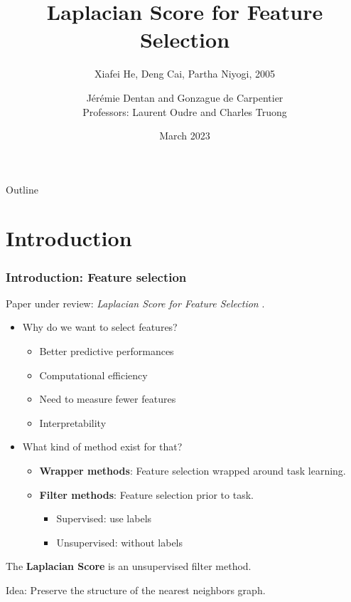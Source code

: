 \documentclass{beamer}
\title[Laplacian Score]{Laplacian Score for Feature Selection}
\subtitle{
    Xiafei He, Deng Cai, Partha Niyogi, 2005
}
\author{Jérémie Dentan and Gonzague de Carpentier \\ Professors: Laurent Oudre and Charles Truong}
\date{March 2023}
\begin{document}
\frame{\titlepage}

\begin{frame}{Outline}
    \tableofcontents
\end{frame}


\section{Introduction}
\begin{frame}
\frametitle{Introduction: Feature selection}

Paper under review: \textit{Laplacian Score for Feature Selection} \cite{he_laplacian_2005}.

\medskip

\begin{itemize}
    \item Why do we want to select features? \cite{guyon_introduction_2003}
    \begin{itemize}
        \item Better predictive performances
        \item Computational efficiency
        \item Need to measure fewer features
        \item Interpretability
    \end{itemize}
    
    \item What kind of method exist for that?
    \begin{itemize}
        \item \textbf{Wrapper methods}: Feature selection wrapped around task learning.
        \item \textbf{Filter methods}: Feature selection prior to task.
        \begin{itemize}
            \item Supervised: use labels
            \item Unsupervised: without labels
        \end{itemize}
    \end{itemize}
\end{itemize}

\medskip

The \textbf{Laplacian Score} is an unsupervised filter method.

Idea: Preserve the structure of the nearest neighbors graph.

\end{frame}
\end{document}
